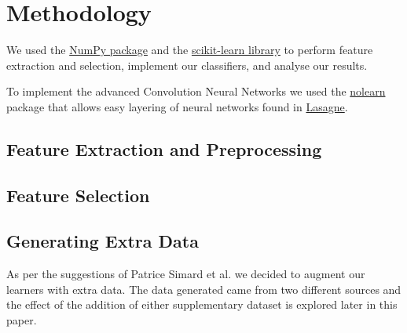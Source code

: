 \documentclass[conference]{IEEEtran}
\begin{document}
\section{Methodology}

We used the \href{http://www.numpy.org/}{NumPy package} and the \href{http://www.scikit-learn.org/}{scikit-learn library} to perform feature extraction and selection, implement our classifiers, and analyse our results. 

To implement the advanced Convolution Neural Networks we used the \href{http://pythonhosted.org/nolearn/}{nolearn} package that allows easy layering of neural networks found in \href{http://lasagne.readthedocs.org/}{Lasagne}.

\subsection{Feature Extraction and Preprocessing}


\subsection{Feature Selection}

\subsection{Generating Extra Data}

As per the suggestions of Patrice Simard et al. \cite{Simard} we decided to augment our learners with extra data. The data generated came from two different sources and the effect of the addition of either supplementary dataset is explored later in this paper.
\end{document}
